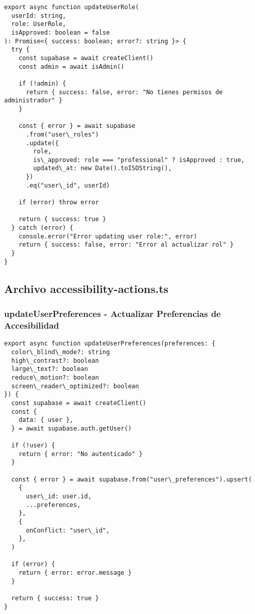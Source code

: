 \documentclass[12pt,a4paper]{article}
\begin{document}
\begin{lstlisting}[caption=Función updateUserRole completa]
export async function updateUserRole(
  userId: string,
  role: UserRole,
  isApproved: boolean = false
): Promise<{ success: boolean; error?: string }> {
  try {
    const supabase = await createClient()
    const admin = await isAdmin()

    if (!admin) {
      return { success: false, error: "No tienes permisos de administrador" }
    }

    const { error } = await supabase
      .from("user\_roles")
      .update({
        role,
        is\_approved: role === "professional" ? isApproved : true,
        updated\_at: new Date().toISOString(),
      })
      .eq("user\_id", userId)

    if (error) throw error

    return { success: true }
  } catch (error) {
    console.error("Error updating user role:", error)
    return { success: false, error: "Error al actualizar rol" }
  }
}
\end{lstlisting}

\subsection{Archivo accessibility-actions.ts}

\subsubsection{updateUserPreferences - Actualizar Preferencias de Accesibilidad}

\begin{lstlisting}[caption=Función updateUserPreferences completa]
export async function updateUserPreferences(preferences: {
  color\_blind\_mode?: string
  high\_contrast?: boolean
  large\_text?: boolean
  reduce\_motion?: boolean
  screen\_reader\_optimized?: boolean
}) {
  const supabase = await createClient()
  const {
    data: { user },
  } = await supabase.auth.getUser()

  if (!user) {
    return { error: "No autenticado" }
  }

  const { error } = await supabase.from("user\_preferences").upsert(
    {
      user\_id: user.id,
      ...preferences,
    },
    {
      onConflict: "user\_id",
    },
  )

  if (error) {
    return { error: error.message }
  }

  return { success: true }
}
\end{lstlisting}
\end{document}
